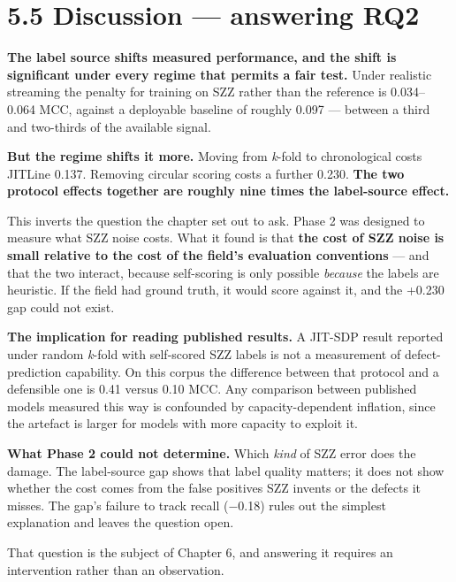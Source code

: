 \section{5.5 Discussion --- answering
RQ2}\label{discussion-answering-rq2}

\textbf{The label source shifts measured performance, and the shift is
significant under every regime that permits a fair test.} Under
realistic streaming the penalty for training on SZZ rather than the
reference is 0.034--0.064 MCC, against a deployable baseline of roughly
0.097 --- between a third and two-thirds of the available signal.

\textbf{But the regime shifts it more.} Moving from \emph{k}-fold to
chronological costs JITLine 0.137. Removing circular scoring costs a
further 0.230. \textbf{The two protocol effects together are roughly
nine times the label-source effect.}

This inverts the question the chapter set out to ask. Phase 2 was
designed to measure what SZZ noise costs. What it found is that
\textbf{the cost of SZZ noise is small relative to the cost of the
field's evaluation conventions} --- and that the two interact, because
self-scoring is only possible \emph{because} the labels are heuristic.
If the field had ground truth, it would score against it, and the +0.230
gap could not exist.

\textbf{The implication for reading published results.} A JIT-SDP result
reported under random \emph{k}-fold with self-scored SZZ labels is not a
measurement of defect-prediction capability. On this corpus the
difference between that protocol and a defensible one is 0.41 versus
0.10 MCC. Any comparison between published models measured this way is
confounded by capacity-dependent inflation, since the artefact is larger
for models with more capacity to exploit it.

\textbf{What Phase 2 could not determine.} Which \emph{kind} of SZZ
error does the damage. The label-source gap shows that label quality
matters; it does not show whether the cost comes from the false
positives SZZ invents or the defects it misses. The gap's failure to
track recall (\ensuremath{-}0.18) rules out the simplest explanation and leaves the
question open.

That question is the subject of Chapter 6, and answering it requires an
intervention rather than an observation.
